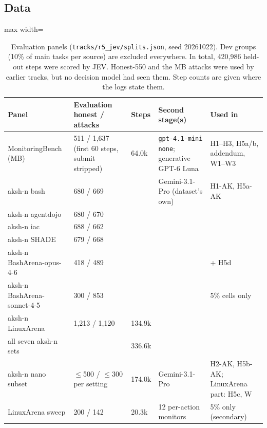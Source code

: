 \documentclass[11pt]{article}
\begin{document}
\subsection{Data}
\begin{table}[H]\centering\small
\begin{adjustbox}{max width=\linewidth}
\begin{tabular}{@{}lllll@{}}
\toprule
Panel & Evaluation honest / attacks & Steps & Second stage(s) & Used in\\
\midrule
MonitoringBench (MB) & 511 / 1{,}637 (first 60 steps, submit stripped) & 64.0k & \texttt{gpt-4.1-mini} \texttt{none}; generative GPT-6 Luna & H1--H3, H5a/b, addendum, W1--W3\\
aksh-n bash & 680 / 669 & & Gemini-3.1-Pro (dataset's own) & H1-AK, H5a-AK\\
aksh-n agentdojo & 680 / 670 & & & \\
aksh-n iac & 688 / 662 & & & \\
aksh-n SHADE & 679 / 668 & & & \\
aksh-n BashArena-opus-4-6 & 418 / 489 & & & + H5d\\
aksh-n BashArena-sonnet-4-5 & 300 / 853 & & & 5\% cells only\\
aksh-n LinuxArena & 1{,}213 / 1{,}120 & 134.9k & & \\
\quad all seven aksh-n sets & & 336.6k & & \\
aksh-n nano subset & $\le$500 / $\le$300 per setting & 174.0k & Gemini-3.1-Pro & H2-AK, H5b-AK; LinuxArena part: H5c, W\\
LinuxArena sweep & 200 / 142 & 20.3k & 12 per-action monitors & 5\% only (secondary)\\
\bottomrule
\end{tabular}
\end{adjustbox}
\caption{Evaluation panels (\nolinkurl{tracks/r5_jev/splits.json}, seed 20261022). Dev groups (10\% of main tasks per source) are excluded everywhere. In total, 420{,}986 held-out steps were scored by JEV. Honest-550 and the MB attacks were used by earlier tracks, but no decision model had seen them. Step counts are given where the logs state them.}\label{tab:data}
\end{table}
\end{document}
